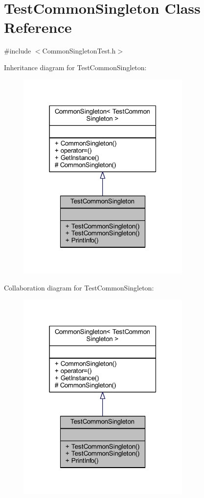 \hypertarget{class_test_common_singleton}{}\section{Test\+Common\+Singleton Class Reference}
\label{class_test_common_singleton}


{\ttfamily \#include $<$Common\+Singleton\+Test.\+h$>$}



Inheritance diagram for Test\+Common\+Singleton\+:
\nopagebreak
\begin{figure}[H]
\begin{center}
\leavevmode
\includegraphics[width=243pt]{class_test_common_singleton__inherit__graph}
\end{center}
\end{figure}


Collaboration diagram for Test\+Common\+Singleton\+:
\nopagebreak
\begin{figure}[H]
\begin{center}
\leavevmode
\includegraphics[width=243pt]{class_test_common_singleton__coll__graph}
\end{center}
\end{figure}
